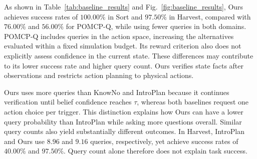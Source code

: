 

As shown in Table~\ref{tab:baseline_results} and Fig.~\ref{fig:baseline_results}, Ours achieves success rates of $100.00\%$ in Sort and $97.50\%$ in Harvest, compared with $76.00\%$ and $56.00\%$ for POMCP-Q, while using fewer queries in both domains. POMCP-Q includes queries in the action space, increasing the alternatives evaluated within a fixed simulation budget. Its reward criterion also does not explicitly assess confidence in the current state. These differences may contribute to its lower success rate and higher query count. Ours verifies state facts after observations and restricts action planning to physical actions.

Ours uses more queries than KnowNo and IntroPlan because it continues verification until belief confidence reaches $\tau$, whereas both baselines request one action choice per trigger. This distinction explains how Ours can have a lower query probability than IntroPlan while asking more questions overall. Similar query counts also yield substantially different outcomes. In Harvest, IntroPlan and Ours use $8.96$ and $9.16$ queries, respectively, yet achieve success rates of $40.00\%$ and $97.50\%$. Query count alone therefore does not explain task success.

